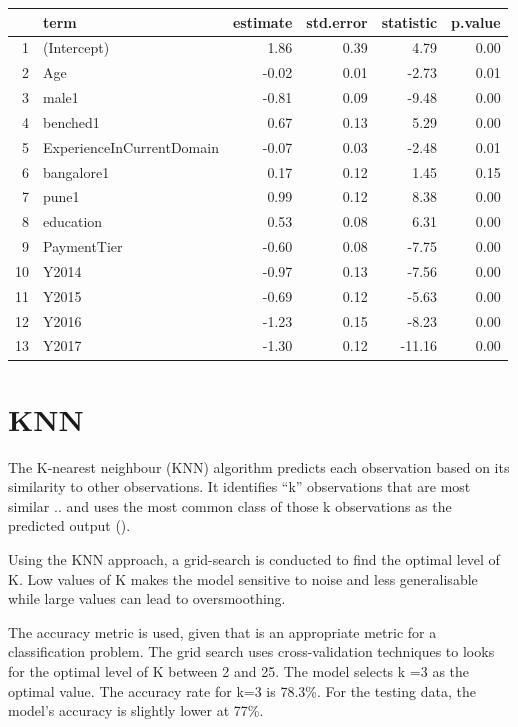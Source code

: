 \documentclass[11pt,preprint, authoryear]{elsarticle}
\let\origtable\table
\let\endorigtable\endtable
\renewenvironment{table}[1][2] {
    \expandafter\origtable\expandafter[H]
} {
    \endorigtable
}
\numberwithin{equation}{section}
\numberwithin{figure}{section}
\numberwithin{table}{section}
\begin{document}
\begin{table}[H]
\centering
\begin{tabular}{rlrrrr}
  \hline
 & term & estimate & std.error & statistic & p.value \\ 
  \hline
1 & (Intercept) & 1.86 & 0.39 & 4.79 & 0.00 \\ 
  2 & Age & -0.02 & 0.01 & -2.73 & 0.01 \\ 
  3 & male1 & -0.81 & 0.09 & -9.48 & 0.00 \\ 
  4 & benched1 & 0.67 & 0.13 & 5.29 & 0.00 \\ 
  5 & ExperienceInCurrentDomain & -0.07 & 0.03 & -2.48 & 0.01 \\ 
  6 & bangalore1 & 0.17 & 0.12 & 1.45 & 0.15 \\ 
  7 & pune1 & 0.99 & 0.12 & 8.38 & 0.00 \\ 
  8 & education & 0.53 & 0.08 & 6.31 & 0.00 \\ 
  9 & PaymentTier & -0.60 & 0.08 & -7.75 & 0.00 \\ 
  10 & Y2014 & -0.97 & 0.13 & -7.56 & 0.00 \\ 
  11 & Y2015 & -0.69 & 0.12 & -5.63 & 0.00 \\ 
  12 & Y2016 & -1.23 & 0.15 & -8.23 & 0.00 \\ 
  13 & Y2017 & -1.30 & 0.12 & -11.16 & 0.00 \\ 
   \hline
\end{tabular}
\caption{Logistic Regression Results \label{tab1}} 
\end{table}

\hypertarget{knn}{%
\section*{KNN}\label{knn}}

The K-nearest neighbour (KNN) algorithm predicts each observation based
on its similarity to other observations. It identifies ``k''
observations that are most similar .. and uses the most common class of
those k observations as the predicted output ().

Using the KNN approach, a grid-search is conducted to find the optimal
level of K. Low values of K makes the model sensitive to noise and less
generalisable while large values can lead to oversmoothing.

The accuracy metric is used, given that is an appropriate metric for a
classification problem. The grid search uses cross-validation techniques
to looks for the optimal level of K between 2 and 25. The model selects
k =3 as the optimal value. The accuracy rate for k=3 is 78.3\%. For the
testing data, the model's accuracy is slightly lower at 77\%.
\end{document}
